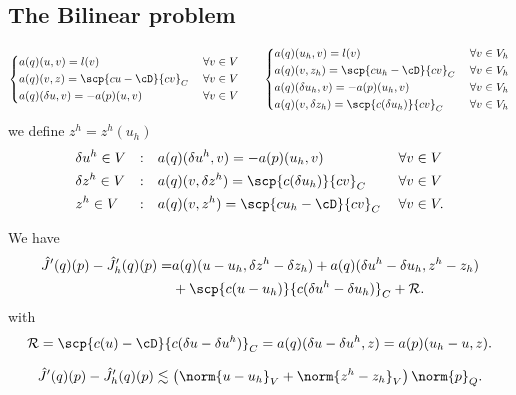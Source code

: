 \subsection{The Bilinear problem}\label{subsec:}
%
%
\begin{align*}
%
\left\{
\begin{aligned}
&a(q)(u,v) = l(v)&\; \forall v\in V\\
&a(q)(v, z) = \scp{cu-\cD}{cv}_C&\; \forall v\in V\\
&a(q)(\delta u,v) = -a(p)(u,v)&\; \forall v\in V\\
\end{aligned}
\right.
%
\qquad
%
\left\{
\begin{aligned}
&a(q)(u_h,v) = l(v)&\; \forall v\in V_h\\
&a(q)(v, z_h) = \scp{cu_h-\cD}{cv}_C&\; \forall v\in V_h\\
&a(q)(\delta u_h,v) = -a(p)(u_h,v)&\; \forall v\in V_h\\
&a(q)(v,\delta z_h) = \scp{c(\delta u_h)}{cv}_C&\; \forall v\in V_h
\end{aligned}
\right.
%
\end{align*}
%
we define $z^h=z^h(u_h)$
%
\begin{alignat*}{3}
&\delta u^h\in V&:&\quad a(q)(\delta u^h,v) = -a(p)(u_h,v)\; &\forall& v\in V\\
&\delta z^h\in V&:&\quad a(q)(v,\delta z^h) = \scp{c(\delta u_h)}{cv}_C\; &\forall& v\in V\\
&z^h\in V&:&\quad a(q)(v, z^h) = \scp{cu_h-\cD}{cv}_C\; &\forall& v\in V.
\end{alignat*}
%
\begin{theorem}\label{thm:}
We have
%
\begin{equation}\label{eq:ErrorGradRepLQ}
\begin{split}
\hat J'(q)(p) - \hat J_h'(q)(p) =& a(q)(u-u_h,\delta z^{h}-\delta z_h) + a(q)(\delta u^h-\delta u_h,z^h-z_h)\\
&+\scp{c(u-u_h)}{c(\delta u^h-\delta u_h)}_C + \mathcal R.
\end{split}
\end{equation}
%
%
with
%
\begin{equation}\label{eq:ErrorGradRemainder}
\mathcal R = \scp{c(u)-\cD}{c(\delta u-\delta u^h)}_C = a(q)(\delta u-\delta u^h, z)= a(p)(u_h-u,z).
\end{equation}
%
\end{theorem}
%
%
\begin{corollary}\label{cor:}
%
\begin{equation}\label{eq:}
\hat J'(q)(p) - \hat J_h'(q)(p) \lesssim \left( \norm{u-u_h}_V + \norm{z^h-z_h}_V \right) \norm{p}_Q.
\end{equation}
%
\end{corollary}
%

